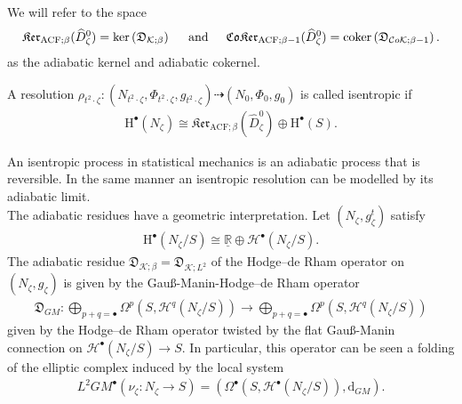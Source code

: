 \documentclass[psamsfonts]{amsart}
\theoremstyle{plain}
\theoremstyle{definition}{
\newtheorem{defi}{Definition}[section]
\newtheorem{ass}{Assumption}
\newtheorem*{nota}{Notation}}
\theoremstyle{remark}{
\newtheorem{rem}{Remark}
\newtheorem{ex}{Example}}
\theoremstyle{plain}{
\newtheorem{thm}{Theorem}[section]
\newtheorem{lem}{Lemma}[section]
\newtheorem{cor}{Corollary}[section]
\newtheorem{prop}{Proposition}[section]
\newtheorem{con}{Conjecture}[section]}
\newcommand{\m}[1]{{\mathrm{#1}}}
\newcommand{\und}[1]{\hspace{#1}\text{and}\hspace{#1}}
\begin{document}
\begin{defi}
We will refer to the space 
\begin{align*}
    \mathfrak{Ker}_{\m{ACF};\beta}(\widehat{D}^0_\zeta)=\m{ker}\left(\mathfrak{D}_{\mathcal{K};\beta}\right)\und{.5cm}\mathfrak{CoKer}_{\m{ACF};\beta-1}(\widehat{D}^0_\zeta)=\m{coker}\left(\mathfrak{D}_{\mathcal{C}o\mathcal{K};\beta-1}\right).
\end{align*}
as the adiabatic kernel and adiabatic cokernel.
\end{defi}

\begin{defi}
    A resolution $\rho_{t^2\cdot\zeta}\colon (N_{t^2\cdot\zeta},\Phi_{t^2\cdot\zeta},g_{t^2\cdot\zeta})\dashrightarrow (N_0,\Phi_0,g_0)$ is called isentropic if 
    \begin{align*}
        \m{H}^{\bullet}(N_\zeta)\cong\mathfrak{Ker}_{\m{ACF};\beta}(\widehat{D}^0_\zeta)\oplus\m{H}^\bullet(S).
    \end{align*}
\end{defi}
    An isentropic process in statistical mechanics is an adiabatic process that is reversible. In the same manner an isentropic resolution can be modelled by its adiabatic limit.\\


The adiabatic residues have a geometric interpretation. Let $(N_\zeta,g^t_\zeta)$ satisfy 
\begin{align}
    \m{H}^\bullet(N_\zeta/S)\cong\underline{\mathbb{R}}\oplus\mathcal{H}^\bullet(N_\zeta/S).
\end{align}
The adiabatic residue $\mathfrak{D}_{\mathcal{K};\beta}=\mathfrak{D}_{\mathcal{K};L^2}$ of the Hodge--de Rham operator on $(N_\zeta,g_\zeta)$ is given by the Gauß-Manin-Hodge--de Rham operator
\begin{align*}
    \mathfrak{D}_{GM} \colon\bigoplus_{p+q=\bullet}\Omega^p\left(S, \mathcal{H}^q(N_\zeta/S)\right)\rightarrow\bigoplus_{p+q=\bullet}\Omega^p\left(S, \mathcal{H}^q(N_\zeta/S)\right)
\end{align*}
given by the Hodge--de Rham operator twisted by the flat Gauß-Manin connection on $\mathcal{H}^\bullet(N_\zeta/S)\rightarrow S$. In particular, this operator can be seen a folding of the elliptic complex induced by the local system
\begin{align*}
    L^2GM^\bullet(\nu_\zeta\colon N_\zeta\rightarrow S)=(\Omega^{\bullet}(S,\mathcal{H}^\bullet(N_\zeta/S)),\m{d}_{GM}).
\end{align*}
\end{document}
